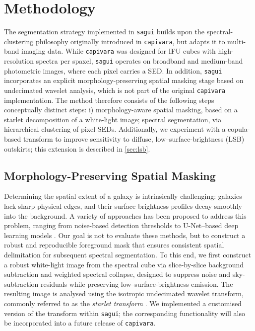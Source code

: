 \documentclass[fleqn,usenatbib]{mnras}
\begin{document}
\section{Methodology}
\label{sec:method}
The segmentation strategy implemented in \texttt{sagui} builds upon the spectral-clustering philosophy originally introduced in \texttt{capivara}, but adapts it to multi-band imaging data. While \texttt{capivara} was designed for IFU cubes with high-resolution spectra per spaxel, \texttt{sagui} operates on broadband and medium-band photometric images, where each pixel carries a SED. In addition, \texttt{sagui} incorporates an explicit morphology-preserving spatial masking stage based on undecimated wavelet analysis, which is not part of the original \texttt{capivara} implementation. The method therefore consists of the following steps conceptually distinct steps: i) morphology-aware spatial masking, based on a starlet decomposition of a white-light image; spectral segmentation, via hierarchical clustering of pixel SEDs. Additionally, we experiment with a copula-based transform to improve sensitivity to diffuse, low–surface-brightness (LSB) outskirts; this extension is described in \autoref{sec:lsb}.




\subsection{Morphology-Preserving Spatial Masking}


Determining the spatial extent of a galaxy is intrinsically challenging: galaxies lack sharp physical edges, and their surface-brightness profiles decay smoothly into the background. A variety of approaches has been proposed to address this problem, ranging from noise-based detection thresholds \citep[e.g.][]{Akhlaghi2015} to U-Net–based deep learning models \citep[e.g.][]{Iglesias2024}. Our goal is not to evaluate these methods, but to construct a robust and reproducible foreground mask that ensures consistent spatial delimitation for subsequent spectral segmentation. To this end, we first construct a robust white-light image from the spectral cube via slice-by-slice background subtraction and weighted spectral collapse, designed to suppress noise and sky-subtraction residuals while preserving low--surface-brightness emission. The resulting image is analysed using the isotropic undecimated wavelet transform, commonly referred to as the \emph{starlet transform} \citep[e.g.][]{starck_murtagh_2006,starck_fadili_murtagh_2007}. We implemented a customised version of the transform within \texttt{sagui}; the corresponding functionality will also be incorporated into a future release of \texttt{capivara}.
\end{document}
